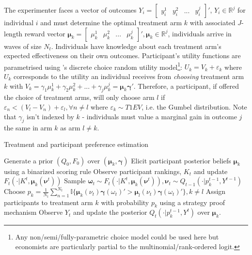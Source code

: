 \documentclass[twoside,11pt]{article}
\begin{document}
The experimenter faces a vector of outcomes $Y_{i} = \begin{bmatrix}
    y^1_{i} & y^2_{i} & ... & y^j_{i}
\end{bmatrix}'$, $Y_i \in \mathbb{R}^j$ for individual $i$ and must determine 
the optimal treatment 
arm $k$ with associated $J$-length reward vector $\bm{\mu}_k = \begin{bmatrix}
    \mu^1_k & \mu^2_k & ... & \mu^j_k
\end{bmatrix}', \bm{\mu}_k \in \mathbb{R}^j$, individuals arrive in waves of size
$N_t$. Individuals have knowledge about each treatment arm's 
expected effectiveness on their own outcomes. Participant's
 utility functions are parametrised using \cite{mcfadden}'s discrete 
choice random utility model\footnote{Any non/semi/fully-parametric choice model could be used here 
but economists are particularly partial to the multinomial/rank-ordered logit.}: $U_k = V_k + \varepsilon_k$ 
where $U_k$  corresponds to the utility an individual receives from \emph{choosing} treatment arm $k$ 
with $V_k = \gamma_1 \mu_k^1 + \gamma_2 \mu_k^2 + ... + \gamma_j \mu_k^j = \bm{\mu}_k \bm{\gamma}'$. 
Therefore, a participant, if offered 
the choice of treatment arms, will only choose arm $l$ if $\varepsilon_n < (V_l - 
V_n) + \varepsilon_l, \forall n \neq l$ where $\varepsilon_k \sim T1EV$, i.e. the 
Gumbel distribution. Note that 
$\gamma_j$ isn't indexed by $k$ - individuals must value a marginal gain in 
outcome $j$ the same in arm $k$ as arm $l \neq k$.


\begin{algorithm}
  \caption{Treatment and participant preference estimation }\label{alg:cap}
  \begin{algorithmic}
  \State Generate a prior $(Q_0, F_0)$ over $\left(\bm{\mu}_k, \bm{\gamma}\right)$
  \State Elicit participant posterior beliefs $\bm{\mu}_k$ using a binarized scoring rule
  \State Observe participant rankings, $K_t$ and update $F_{t}( \cdot | K^{t}, \bm{\mu}_k(\bm{\nu}^{t}))$ 
  \State Sample $\bm{\omega}_{t} \sim F_{t}( \cdot | K^{t}, \bm{\mu}_k(\bm{\nu}^{t})), \bm{\nu}_t \sim Q_{t-1}(\cdot | p_{k}^{t-1}, Y^{t-1})$ 
  \State Choose $p_k = \frac{1}{N_t} 
  \sum^{N_t}_{n=1} \mathbb{I}\{\bm{\mu}_k(\nu_{t}) \bm{\gamma}(\omega_{t})' > \bm{\mu}_l(\nu_{t}) \bm{\gamma}(\omega_{t})'\}, k \neq l$ 
  \State Assign participants to treatment arm $k$ with probability $p_{k}$ using a strategy proof mechanism 
  \State Observe $Y_t$ and update the posterior $Q_{t}(\cdot | p_k^{t-1}, Y^{t})$ over $\bm{\mu}_k$. 
  \EndFor
  \end{algorithmic}
  \end{algorithm}
\end{document}
